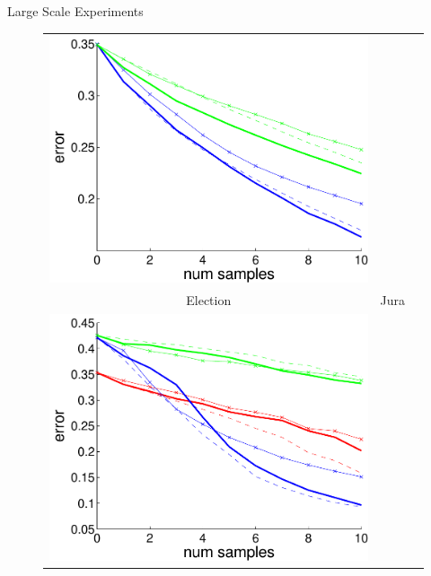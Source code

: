 \documentclass[final]{beamer}
\newlength{\onecolwid}
\begin{document}
\begin{frame}[t]
\begin{columns}[t]
\begin{column}{\onecolwid}
\begin{block}{Large Scale Experiments}
\begin{figure}[h!]
\begin{tabular}{ccc}
          \includegraphics[scale=0.7]{figs/error_movieLensDataLargeScale.pdf}\\
          Election&
          Jura&
          \\
          \includegraphics[scale=0.7]{figs/error_electionDataLargeScale.pdf}&

\end{tabular}
\end{figure}
\end{block}
\end{column}
\end{columns}
\end{frame}
\end{document}
